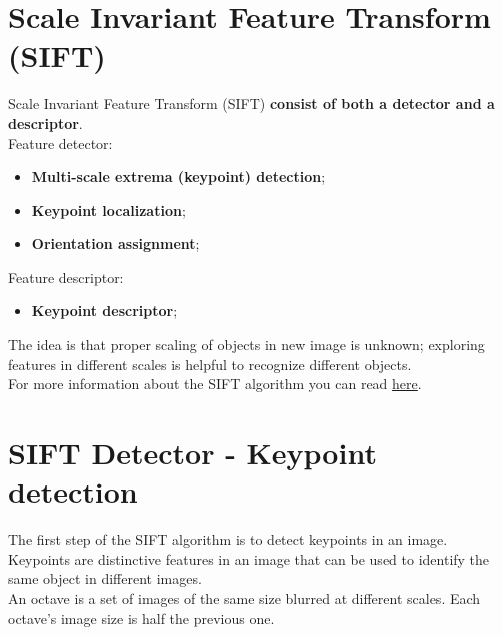 \documentclass{article}
\begin{document}
\section*{Scale Invariant Feature Transform (SIFT)}

Scale Invariant Feature Transform (SIFT) \textbf{consist of both a detector and a descriptor}. \\

Feature detector:
\begin{itemize}
    \item \textbf{Multi-scale extrema (keypoint) detection};
    \item \textbf{Keypoint localization};
    \item \textbf{Orientation assignment};
\end{itemize}

Feature descriptor:
\begin{itemize}
    \item \textbf{Keypoint descriptor};
\end{itemize}

The idea is that proper scaling of objects in new image is unknown; exploring features in different scales is helpful to recognize different objects.\\

For more information about the SIFT algorithm you can read \href{https://medium.com/data-breach/introduction-to-sift-scale-invariant-feature-transform-65d7f3a72d40/}{here}.

\newpage

\section*{SIFT Detector - Keypoint detection}

The first step of the SIFT algorithm is to detect keypoints in an image. Keypoints are distinctive features in an image that can be used to identify the same object in different images. \\

An octave is a set of images of the same size blurred at different scales. Each octave's image size is half the previous one. 
\end{document}
